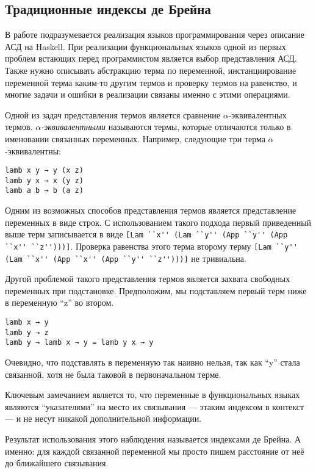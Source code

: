 \subsection{Традиционные индексы де Брейна}\label{de_brujin}
В работе подразумевается реализация языков программирования через описание АСД на Haskell. При реализации функциональных языков одной из первых проблем встающих перед программистом является выбор представления АСД. Также нужно описывать абстракцию терма по переменной, инстанциирование переменной терма каким-то другим термов и проверку термов на равенство, и многие задачи и ошибки в реализации связаны именно с этими операциями.

Одной из задач представления термов является сравнение $\alpha$-эквивалентных термов. \textit{$\alpha$-эквивалентными} называются термы, которые отличаются только в именовании связанных переменных. Например, следующие три терма $\alpha$-эквивалентны:

\begin{lstlisting}
lamb x y → y (x z)
lamb y x → x (y z)
lamb a b → b (a z)
\end{lstlisting}

Одним из возможных способов представления термов является представление переменных в виде строк. С использованием такого подхода первый приведенный выше терм записывается в виде \lstinline{[Lam ``x'' (Lam ``y'' (App ``y'' (App ``x'' ``z'')))]}. Проверка равенства этого терма второму терму \lstinline{[Lam ``y'' (Lam ``x'' (App ``x'' (App ``y'' ``z'')))]} не тривиальна.

Другой проблемой такого представления термов является захвата свободных переменных при подстановке. Предположим, мы подставляем первый терм ниже в переменную ``z'' во втором.
\begin{lstlisting}
lamb x → y
lamb y → z
lamb y → lamb x → y = lamb y x → y
\end{lstlisting}

Очевидно, что подставлять в переменную так наивно нельзя, так как ``y'' стала связанной, хотя не была таковой в первоначальном терме.

Ключевым замечанием является то, что переменные в функциональных языках являются ``указателями'' на место их связывания --- этаким индексом в контекст --- и не несут никакой дополнительной информации.

Результат использования этого наблюдения называется индексами де Брейна. А именно: для каждой связанной переменной мы просто пишем расстояние от неё до ближайшего связывания.

